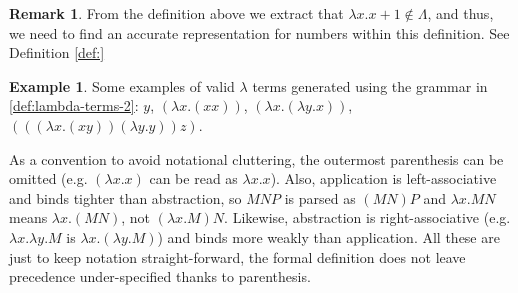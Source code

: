 \documentclass[12pt]{book}
\newcommand{\la}{\lambda}
\newcommand{\La}{\Lambda}
\theoremstyle{plain}
\theoremstyle{definition}
\theoremstyle{definition}
\newtheorem{example}{Example}[section]
\theoremstyle{definition}
\newtheorem*{remark}{Remark}
\begin{document}
\begin{remark}
  From the definition above we extract that \( \lambda x . x + 1 \notin \La \), and thus, we need to find an accurate representation for numbers within this definition. See Definition \ref{def:}
\end{remark}
\begin{example} Some examples of valid $\la$ terms generated using the grammar in \ref{def:lambda-terms-2}:
  \( y \),
  \( (\la x. (x x)) \),
  \( (\la x. (\la y. x)) \),
  \( (((\la x. (x y)) (\la y. y)) z) \).
\end{example}
As a convention to avoid notational cluttering, the outermost parenthesis can be omitted (e.g. $ ( \la x.x ) $ can be read as $ \la x.x $). Also, application is left-associative  and binds tighter than abstraction, so $M N P$ is parsed as $(M N) P$ and $\la x . M N$ means $\la x . (M N)$, not $(\la x . M) N$. Likewise, abstraction is right-associative (e.g. $\la x . \la y . M$ is $\la x . (\la y . M)$) and binds more weakly than application. All these are just to keep notation straight-forward, the formal definition does not leave precedence under-specified thanks to parenthesis.
\end{document}
